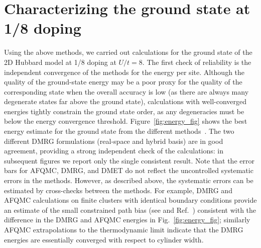 \documentclass[12pt]{article}
\newcommand{\blue}{\textcolor{blue}}
\begin{document}
\section*{Characterizing the ground state at 1/8 doping}

Using the above methods, we carried out calculations for the ground state of the 2D Hubbard model at 1/8 doping at $U/t=8$.
The first check of reliability is the independent convergence of the methods for the energy per site.
Although the quality of the ground-state energy may be a poor proxy for the quality of the corresponding state when the overall
accuracy is low (as there are always many degenerate states far above the ground state), calculations
with well-converged energies 
tightly constrain the ground state order, as
any degeneracies must be below the energy convergence threshold.
Figure~\ref{fig:energy_fig} shows the best energy estimate for the ground state from
the different methods~\cite{supplementary}. The two different DMRG formulations (real-space and hybrid basis)
are in good agreement, providing a strong independent check of the calculations: in subsequent figures
we report only the single consistent result.
Note that the error bars for AFQMC, DMRG, and DMET do not
reflect the uncontrolled systematic errors in the methods. However,
as described above, the systematic errors can be estimated by cross-checks between the methods.
For example, DMRG and AFQMC calculations on finite clusters with identical boundary conditions
provide an estimate of the small constrained path bias (see \cite{supplementary} and Ref.~\cite{qin2016coupling}) consistent
with the difference in the DMRG and AFQMC energies in Fig.~\ref{fig:energy_fig}; similarly
AFQMC extrapolations to the thermodynamic limit indicate that the DMRG energies are essentially
converged with respect to cylinder width.


\end{document}
